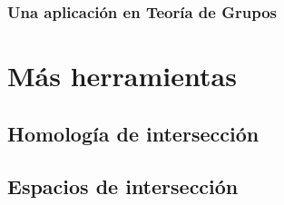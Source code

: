 \documentclass[12pt]{book}
\begin{document}
\section{Una aplicación en Teoría de Grupos}










\part{Más herramientas}	


\chapter{Homología de intersección}



\chapter{Espacios de intersección}
\end{document}

